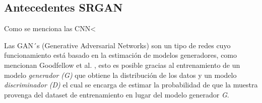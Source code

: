 \subsection{Antecedentes SRGAN}


Como se menciona las CNN<

Las GAN´s (Generative Adversarial Networks) son un tipo de redes cuyo funcionamiento está basado
en la estimación de modelos generadores, como mencionan Goodfellow et al. \cite{GANs}, esto es 
posible gracias al entrenamiento de un modelo \emph{generador (G)} que obtiene la distribución de 
los datos y un modelo \emph{discriminador (D)} el cual se encarga de estimar la probabilidad 
de que la muestra provenga del dataset de entrenamiento en lugar del modelo generador \emph{G}.


